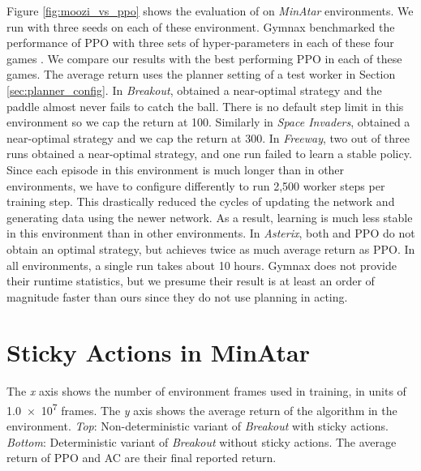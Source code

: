 
Figure \ref{fig:moozi_vs_ppo} shows the evaluation of \moozi on \textit{MinAtar} environments.
We run \moozi with three seeds on each of these environment.
Gymnax benchmarked the performance of PPO with three sets of hyper-parameters in each of these four games \cite{GymnaxJAXbasedReinforcement_RobertTjarkoLange_2022,ProximalPolicyOptimization_Schulman.Wolski.ea_2017}.
We compare our results with the best performing PPO in each of these games.
The average return uses the planner setting of a test worker in Section \ref{sec:planner_config}.
In \textit{Breakout}, \moozi obtained a near-optimal strategy and the paddle almost never fails to catch the ball.
There is no default step limit in this environment so we cap the return at 100.
Similarly in \textit{Space Invaders}, \moozi obtained a near-optimal strategy and we cap the return at 300.
In \textit{Freeway}, two out of three runs  obtained a near-optimal strategy, and one run failed to learn a stable policy.
Since each episode in this environment is much longer than in other environments, we have to configure \moozi differently to run 2,500 worker steps per training step.
This drastically reduced the cycles of updating the network and generating data using the newer network.
As a result, \moozi learning is much less stable in this environment than in other environments.
In \textit{Asterix}, both \moozi and PPO do not obtain an optimal strategy, but \moozi achieves twice as much average return as PPO.
In all environments, a single run takes about 10 hours.
Gymnax does not provide their runtime statistics, but we presume their result is at least an order of magnitude faster than ours since they do not use planning in acting.


\section{Sticky Actions in MinAtar} \label{sec:sticky_minatar}

{
    The \textit{x} axis shows the number of environment frames used in training, in units of \num{1.0e7} frames.
    The \textit{y} axis shows the average return of the algorithm in the environment.
    \textit{Top}: Non-deterministic variant of \textit{Breakout} with sticky actions.
    \textit{Bottom}: Deterministic variant of \textit{Breakout} without sticky actions.
    The average return of PPO and AC are their final reported return.
}

